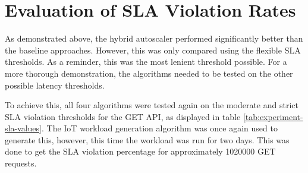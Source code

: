 \section{Evaluation of SLA Violation Rates}
\label{sec:ch6-sla-violation-eval}

As demonstrated above, the hybrid autoscaler performed significantly better than the baseline approaches. However, this was only compared using the flexible SLA thresholds. As a reminder, this was the most lenient threshold possible. For a more thorough demonstration, the algorithms needed to be tested on the other possible latency thresholds.\par

To achieve this, all four algorithms were tested again on the moderate and strict SLA violation thresholds for the GET API, as displayed in table \ref{tab:experiment-sla-values}. The IoT workload generation algorithm was once again used to generate this, however, this time the workload was run for two days. This was done to get the SLA violation percentage for approximately \num[group-separator={,}]{1020000} GET requests.\par

